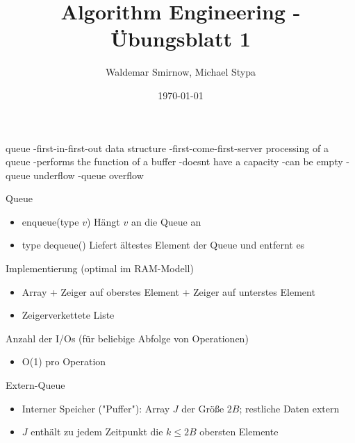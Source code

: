 \documentclass{scrartcl}
\title{Algorithm Engineering - Übungsblatt 1}
\author{Waldemar Smirnow, Michael Stypa}
\date{\today}
\begin{document}
\maketitle

queue
-first-in-first-out data structure
-first-come-first-server processing of a queue
-performs the function of a buffer
-doesnt have a capacity
-can be empty
-queue underflow
-queue overflow


Queue
\begin{itemize}
  \item enqueue(type $v$) Hängt $v$ an die Queue an
  \item type dequeue() Liefert ältestes Element der Queue und entfernt es
\end{itemize}

Implementierung (optimal im RAM-Modell)
\begin{itemize}
  \item Array + Zeiger auf oberstes Element + Zeiger auf unterstes Element
  \item Zeigerverkettete Liste
\end{itemize}

Anzahl der I/Os (für beliebige Abfolge von Operationen)
\begin{itemize}
  \item O(1) pro Operation
\end{itemize}


Extern-Queue
\begin{itemize}
  \item Interner Speicher ("Puffer"): Array $J$ der Größe $2B$; restliche Daten extern
  \item $J$ enthält zu jedem Zeitpunkt die $k \leq 2B$ obersten Elemente
\end{itemize}


\end{document}
